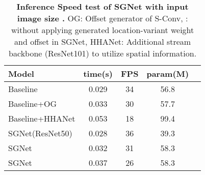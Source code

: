 \documentclass[journal]{IEEEtran}
\begin{document}
\begin{table}[ht]\normalsize
	\centering
	\caption{\textbf{Inference Speed test of SGNet with input image
	    size .}
		OG: Offset generator of S-Conv, \dag : without
		applying generated location-variant weight and offset in SGNet,
		HHANet: Additional stream
		backbone (ResNet101) to utilize spatial information.
	}\label{tab:time}\vspace{-7pt}
	\begin{tabular}{l || c c c c }
		\toprule[1.5pt]
		Model		       &time(s) & FPS  &  param(M)\\
		\hline
		\hline
		Baseline 		  &0.029 &34 &56.8 \\
		Baseline+OG	      &0.033 &30 &57.7 \\
		Baseline+HHANet    &0.053 &18 &99.4 \\
		SGNet(ResNet50)  &0.028 &36 &39.3\\
		SGNet &0.032 &31 &58.3\\
		SGNet  &0.037 &26 &58.3\\

		\bottomrule[1.5pt]
	\end{tabular}
\end{table}

\def\MthdN{Network & Backbone}
\def\FCN{FCN~\cite{fcn} & 2VGG16}
\def\LSDGF{LSD-GF~\cite{local} & 2VGG16}
\def\RefNt{RefineNet~\cite{refinenet} & ResNet152}
\def\ACNet{ACNet~\cite{hu2019acnet} & 2ResNet50}
\def\RDFNt{RDFNet~\cite{rdfnet} & 2ResNet152}
\def\RDFNtsmall{RDFNet~\cite{rdfnet} & 2ResNet101}
\def\CFNet{CFNet~\cite{cascaded} & 2ResNet152}
\def\DCNNs{D-CNN~\cite{dcnn} & 2VGG16}
\def\DCNNss{D-CNN~\cite{dcnn} & 2ResNet152}
\def\DCNN{D-CNN~\cite{dcnn} & VGG16}
\def\DGNN{3DGNN~\cite{qi20173d} & VGG16}
\def\SGNetsmall{SGNet & ResNet50}
\def\SGNet{SGNet & ResNet101}
\def\SGNets{SGNet* & ResNet101}
\end{document}

